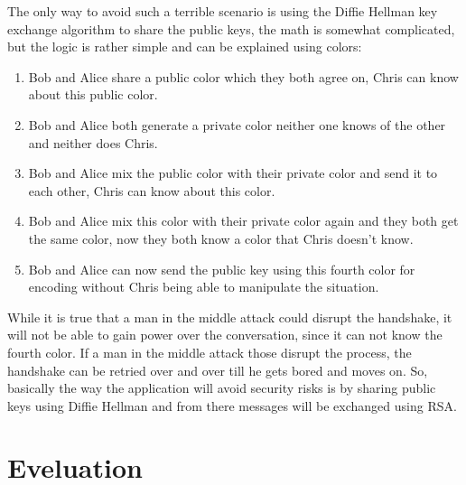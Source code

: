 \documentclass[twoside]{article}
\begin{document}
\begin{multicols}{2}
The only way to avoid such a terrible scenario is using the Diffie Hellman key exchange algorithm to share the public keys, the math is somewhat complicated, but the logic is rather simple and can be explained using colors:

\begin{enumerate}
  \item Bob and Alice share a public color which they both agree on, Chris can know about this public color.
  \item Bob and Alice both generate a private color neither one knows of the other and neither does Chris.
  \item Bob and Alice mix the public color with their private color and send it to each other, Chris can know about this color.
  \item Bob and Alice mix this color with their private color again and they both get the same color, now they both know a color that Chris doesn't know.
  \item Bob and Alice can now send the public key using this fourth color for encoding without Chris being able to manipulate the situation.
\end{enumerate}

While it is true that a man in the middle attack could disrupt the handshake, it will not be able to gain power over the conversation, since it can not know the fourth color. If a man in the middle attack those disrupt the process, the handshake can be retried over and over till he gets bored and moves on. So, basically the way the application will avoid security risks is by sharing public keys using Diffie Hellman and from there messages will be exchanged using RSA.

\section{Eveluation}


\end{multicols}
\end{document}

